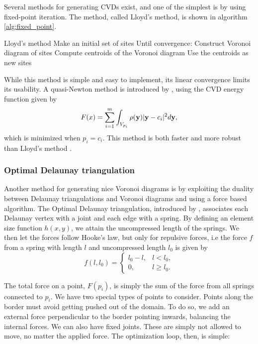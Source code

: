 Several methods for generating CVDs exist, and one of the simplest is by using fixed-point iteration. The method, called Lloyd's method, is shown in algorithm \ref{alg:fixed_point}.

\begin{pseudocode}[label=alg:fixed_point]{Lloyd's method}
    Make an initial set of sites
    Until convergence:
        Construct Voronoi diagram of sites
        Compute centroids of the Voronoi diagram
        Use the centroids as new sites
\end{pseudocode}

While this method is simple and easy to implement, its linear convergence limits its usability. A quasi-Newton method is introduced by \textcite{CVDmethods}, using the CVD energy function given by
\begin{equation}
    F(x) = \sum_{i=1}^m \int_{V_{p_i}} \rho(\mathbf{y}) \lvert\mathbf{y} - c_i\rvert^2 d\mathbf{y},
\end{equation}
which is minimized when $p_i = c_i$. This method is both faster and more robust than Lloyd's method \cite{CVDmethods}.

\subsubsection{Optimal Delaunay triangulation}
\label{sec:optimal-delaunay}
Another method for generating nice Voronoi diagrams is by exploiting the duality between Delaunay triangulations and Voronoi diagrams and using a force based algorithm. The Optimal Delaunay triangulation, introduced by \textcite{Distmesh}, associates each Delaunay vertex with a joint and each edge with a spring. By defining an element size function $h(x, y)$, we attain the uncompressed length of the springs. We then let the forces follow Hooke's law, but only for repulsive forces, i.e the force $f$ from a spring with length $l$ and uncompressed length $l_0$ is given by
\begin{equation}
    \label{eq:delaunay_force}
    f(l, l_0) = \begin{cases}
        l_0 - l, & l < l_0, \\
        0, & l \ge l_0.
    \end{cases}
\end{equation}

The total force on a point, $F(p_i)$, is simply the sum of the force from all springs connected to $p_i$. We have two special types of points to consider. Points along the border must avoid getting pushed out of the domain. To do so, we add an external force perpendicular to the border pointing inwards, balancing the internal forces. We can also have fixed joints. These are simply not allowed to move, no matter the applied force. The optimization loop, then, is simple:

